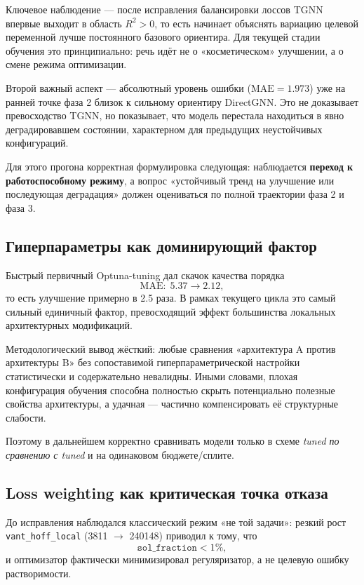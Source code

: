 \documentclass[11pt]{article}
\begin{document}
Ключевое наблюдение --- после исправления балансировки лоссов TGNN впервые выходит в область $R^2>0$, то есть начинает объяснять вариацию целевой переменной лучше постоянного базового ориентира. Для текущей стадии обучения это принципиально: речь идёт не о «косметическом» улучшении, а о смене режима оптимизации.

Второй важный аспект --- абсолютный уровень ошибки ($\mathrm{MAE}=1.973$) уже на ранней точке фаза 2 близок к сильному ориентиру DirectGNN. Это не доказывает превосходство TGNN, но показывает, что модель перестала находиться в явно деградировавшем состоянии, характерном для предыдущих неустойчивых конфигураций.

Для этого прогона корректная формулировка следующая: наблюдается \textbf{переход к работоспособному режиму}, а вопрос «устойчивый тренд на улучшение или последующая деградация» должен оцениваться по полной траектории фаза 2 и фаза 3.

\subsection{Гиперпараметры как доминирующий фактор}

Быстрый первичный Optuna-tuning дал скачок качества порядка
\begin{equation*}
\mathrm{MAE}:\; 5.37 \rightarrow 2.12,
\end{equation*}
то есть улучшение примерно в 2.5 раза. В рамках текущего цикла это самый сильный единичный фактор, превосходящий эффект большинства локальных архитектурных модификаций.

Методологический вывод жёсткий: любые сравнения «архитектура A против архитектуры B» без сопоставимой гиперпараметрической настройки статистически и содержательно невалидны. Иными словами, плохая конфигурация обучения способна полностью скрыть потенциально полезные свойства архитектуры, а удачная --- частично компенсировать её структурные слабости.

Поэтому в дальнейшем корректно сравнивать модели только в схеме \textit{tuned по сравнению с tuned} и на одинаковом бюджете/сплите.

\subsection{Loss weighting как критическая точка отказа}

До исправления наблюдался классический режим «не той задачи»: резкий рост \texttt{vant\_hoff\_local} (3811 $\rightarrow$ 240148) приводил к тому, что
\begin{equation*}
\texttt{sol\_fraction} < 1\%,
\end{equation*}
и оптимизатор фактически минимизировал регуляризатор, а не целевую ошибку растворимости.
\end{document}
